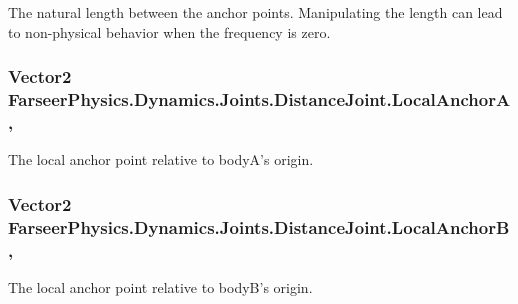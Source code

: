 The natural length between the anchor points. Manipulating the length can lead to non-\/physical behavior when the frequency is zero. 

\hypertarget{class_farseer_physics_1_1_dynamics_1_1_joints_1_1_distance_joint_a413bedd4b2a83a40f4f21e11af7f874e}{
\subsubsection[{Local\+Anchor\+A}]{\setlength{\rightskip}{0pt plus 5cm}Vector2 Farseer\+Physics.\+Dynamics.\+Joints.\+Distance\+Joint.\+Local\+Anchor\+A\hspace{0.3cm}{\ttfamily [get]}, {\ttfamily [set]}}}\label{class_farseer_physics_1_1_dynamics_1_1_joints_1_1_distance_joint_a413bedd4b2a83a40f4f21e11af7f874e}


The local anchor point relative to body\+A's origin. 

\hypertarget{class_farseer_physics_1_1_dynamics_1_1_joints_1_1_distance_joint_a0c6cadd6fc2530aa6e9f8bd4e2ff96ee}{
\subsubsection[{Local\+Anchor\+B}]{\setlength{\rightskip}{0pt plus 5cm}Vector2 Farseer\+Physics.\+Dynamics.\+Joints.\+Distance\+Joint.\+Local\+Anchor\+B\hspace{0.3cm}{\ttfamily [get]}, {\ttfamily [set]}}}\label{class_farseer_physics_1_1_dynamics_1_1_joints_1_1_distance_joint_a0c6cadd6fc2530aa6e9f8bd4e2ff96ee}


The local anchor point relative to body\+B's origin. 

